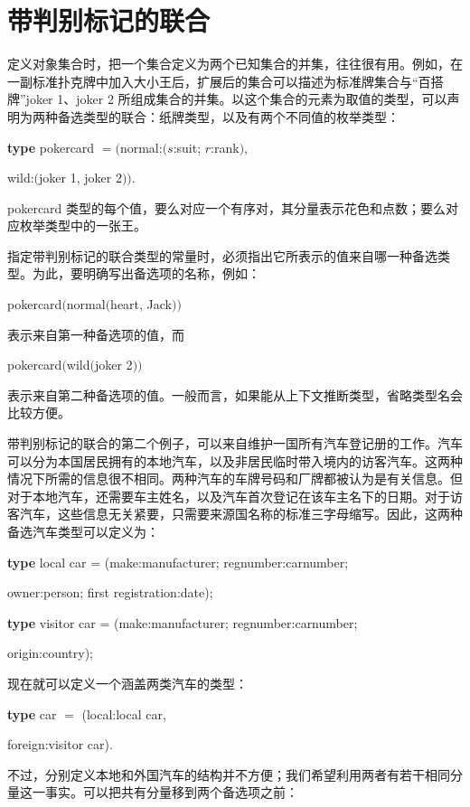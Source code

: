 \section[带判别标记的联合]{带判别标记的联合}

定义对象集合时，把一个集合定义为两个已知集合的并集，往往很有用。例如，在一副标准扑克牌中加入大小王后，扩展后的集合可以描述为标准牌集合与“百搭牌”joker 1、joker 2 所组成集合的并集。以这个集合的元素为取值的类型，可以声明为两种备选类型的联合：纸牌类型，以及有两个不同值的枚举类型：

\quad \textbf{type} pokercard $= ($normal:$(s$:suit; $r$:rank$)$,

\tabto{10.2em}wild:$($joker 1, joker 2$))$.

\noindent
pokercard 类型的每个值，要么对应一个有序对，其分量表示花色和点数；要么对应枚举类型中的一张王。

指定带判别标记的联合类型的常量时，必须指出它所表示的值来自哪一种备选类型。为此，要明确写出备选项的名称，例如：

\quad pokercard$($normal$($heart, Jack$))$

\noindent
表示来自第一种备选项的值，而

\quad pokercard$($wild$($joker 2$))$

\noindent
表示来自第二种备选项的值。一般而言，如果能从上下文推断类型，省略类型名会比较方便。

带判别标记的联合的第二个例子，可以来自维护一国所有汽车登记册的工作。汽车可以分为本国居民拥有的本地汽车，以及非居民临时带入境内的访客汽车。这两种情况下所需的信息很不相同。两种汽车的车牌号码和厂牌都被认为是有关信息。但对于本地汽车，还需要车主姓名，以及汽车首次登记在该车主名下的日期。对于访客汽车，这些信息无关紧要，只需要来源国名称的标准三字母缩写。因此，这两种备选汽车类型可以定义为：

\quad \textbf{type} local car = (make:manufacturer; regnumber:carnumber;

\tabto{9.4em} owner:person; first registration:date);

\quad \textbf{type} visitor car = (make:manufacturer; regnumber:carnumber;

\tabto{10.1em} origin:country);

现在就可以定义一个涵盖两类汽车的类型：

\quad \textbf{type} car $=$ (local:local car,

\tabto{7.4em} foreign:visitor car).

\noindent
不过，分别定义本地和外国汽车的结构并不方便；我们希望利用两者有若干相同分量这一事实。可以把共有分量移到两个备选项之前：

